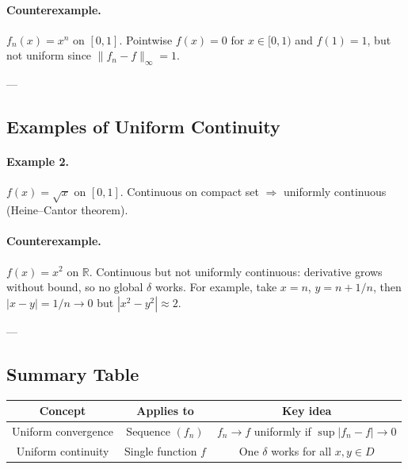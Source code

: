 \documentclass[11pt,a4paper]{article}
\begin{document}
	\paragraph{Counterexample.} $f_n(x)=x^n$ on $[0,1]$.  
	Pointwise $f(x)=0$ for $x\in[0,1)$ and $f(1)=1$, but not uniform since $\|f_n-f\|_\infty=1$.
	
	---
	
	\subsection*{Examples of Uniform Continuity}
	
	\paragraph{Example 2.} $f(x)=\sqrt{x}$ on $[0,1]$.  
	Continuous on compact set $\Rightarrow$ uniformly continuous (Heine--Cantor theorem).
	
	
	\paragraph{Counterexample.} $f(x)=x^2$ on $\mathbb{R}$.  
	Continuous but not uniformly continuous: derivative grows without bound, so no global $\delta$ works.  
	For example, take $x=n$, $y=n+1/n$, then $|x-y|=1/n\to 0$ but $|x^2-y^2|\approx 2$.
	
	---
	
	\subsection*{Summary Table}
	
	\renewcommand{\arraystretch}{1.3}
	\begin{tabular}{|c|c|c|}
		\hline
		Concept & Applies to & Key idea \\
		\hline
		Uniform convergence & Sequence $(f_n)$ & $f_n\to f$ uniformly if $\sup |f_n-f|\to 0$ \\
		\hline
		Uniform continuity & Single function $f$ & One $\delta$ works for all $x,y\in D$ \\
		\hline
	\end{tabular}
	
\end{document}
